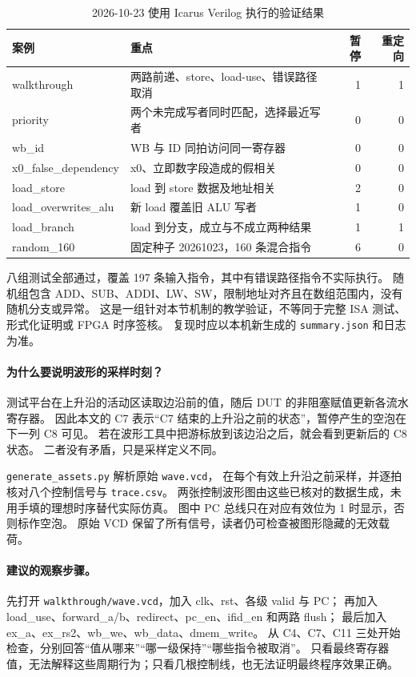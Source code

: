 \begin{table}[htbp]
\centering\small
\caption{2026-10-23 使用 Icarus Verilog 执行的验证结果}\label{tab:ch4-tests}
\begin{tabularx}{\linewidth}{p{.30\linewidth}Yrr}
\toprule
案例 & 重点 & 暂停 & 重定向 \\\midrule
walkthrough & 两路前递、store、load-use、错误路径取消 &1&1\\
priority & 两个未完成写者同时匹配，选择最近写者 &0&0\\
wb\_id & WB 与 ID 同拍访问同一寄存器 &0&0\\
x0\_false\_dependency & x0、立即数字段造成的假相关 &0&0\\
load\_store & load 到 store 数据及地址相关 &2&0\\
load\_overwrites\_alu & 新 load 覆盖旧 ALU 写者 &1&0\\
load\_branch & load 到分支，成立与不成立两种结果 &1&1\\
random\_160 & 固定种子 20261023，160 条混合指令 &6&0\\
\bottomrule
\end{tabularx}
\end{table}

八组测试全部通过，覆盖 197 条输入指令，其中有错误路径指令不实际执行。
随机组包含 ADD、SUB、ADDI、LW、SW，限制地址对齐且在数组范围内，没有随机分支或异常。
这是一组针对本节机制的教学验证，不等同于完整 ISA 测试、形式化证明或 FPGA 时序签核。
复现时应以本机新生成的 \texttt{summary.json} 和日志为准。

\paragraph{为什么要说明波形的采样时刻？}
测试平台在上升沿的活动区读取边沿前的值，随后 DUT 的非阻塞赋值更新各流水寄存器。
因此本文的 C7 表示“C7 结束的上升沿之前的状态”，暂停产生的空泡在下一列 C8 可见。
若在波形工具中把游标放到该边沿之后，就会看到更新后的 C8 状态。
二者没有矛盾，只是采样定义不同。

\texttt{generate\_assets.py} 解析原始 \texttt{wave.vcd}，
在每个有效上升沿之前采样，并逐拍核对八个控制信号与 \texttt{trace.csv}。
两张控制波形图由这些已核对的数据生成，未用手填的理想时序替代实际仿真。
图中 PC 总线只在对应有效位为 1 时显示，否则标作空泡。
原始 VCD 保留了所有信号，读者仍可检查被图形隐藏的无效载荷。

\paragraph{建议的观察步骤。}
先打开 \texttt{walkthrough/wave.vcd}，加入 clk、rst、各级 valid 与 PC；
再加入 load\_use、forward\_a/b、redirect、pc\_en、ifid\_en 和两路 flush；
最后加入 ex\_a、ex\_rs2、wb\_we、wb\_data、dmem\_write。
从 C4、C7、C11 三处开始检查，分别回答“值从哪来”“哪一级保持”“哪些指令被取消”。
只看最终寄存器值，无法解释这些周期行为；只看几根控制线，也无法证明最终程序效果正确。

